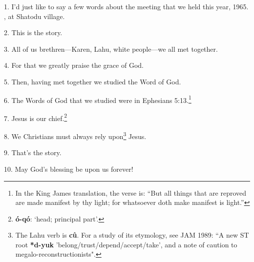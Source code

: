 \setcounter{footnote}{0}

1. I'd just like to say a few words about the meeting that we held this year,
1965. , at Shatodu village.

2. This is the story.

3. All of us brethren---Karen, Lahu, white people---we all met together.

4. For that we greatly praise the grace of God.

5. Then, having met together we studied the Word of God.

6. The Words of God that we studied were in Ephesians 5:13.\footnote{In the King James translation, the verse is: ``But all things that are reproved are made manifest by thy light; for whatsoever doth make manifest is light.''}

7. Jesus is our chief.\footnote{\textbf{ó-qó}: `head; principal part'.}

8. We Christians must always rely upon\footnote{The Lahu verb is \textbf{cû}. For a study of its etymology, see JAM 1989: ``A new ST root \textbf{*d-yuk }'belong/trust/depend/accept/take', and a note of caution to megalo-reconstructionists".} Jesus.

9. That's the story.

10. May God's blessing be upon us forever!

